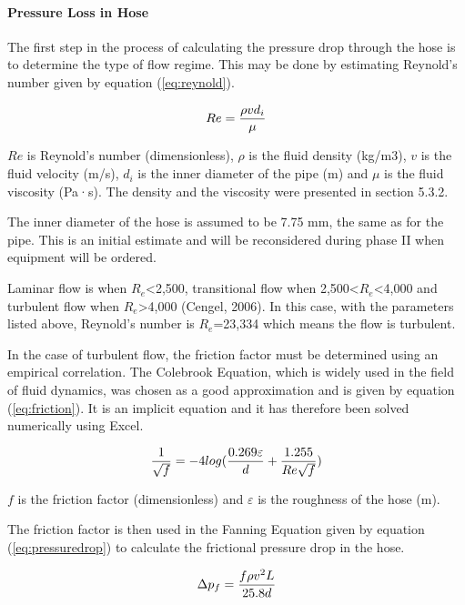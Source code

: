 \paragraph{Pressure Loss in Hose}
The first step in the process of calculating the pressure drop through the hose is to determine the type of flow regime. This may be done by estimating Reynold’s number given by equation (\ref{eq:reynold}).

\begin{equation}
\centering
   Re= \frac{\rho v d_i}{\mu}
\label{eq:reynold}
\end{equation}

$Re$ is Reynold’s number (dimensionless), $\rho$ is the fluid density (kg/m3), $v$ is the fluid velocity (m/s), $d_i$ is the inner diameter of the pipe (m) and $\mu$ is the fluid viscosity (Pa·s). The density and the viscosity were presented in section 5.3.2.

The inner diameter of the hose is assumed to be 7.75 mm, the same as for the pipe. This is an initial estimate and will be reconsidered during phase II when equipment will be ordered.

Laminar flow is when $R_e$<2,500, transitional flow when 2,500<$R_e$<4,000 and turbulent flow when $R_e$>4,000 (Cengel, 2006). In this case, with the parameters listed above, Reynold’s number is $R_e$=23,334 which means the flow is turbulent.

In the case of turbulent flow, the friction factor must be determined using an empirical correlation. The Colebrook Equation, which is widely used in the field of fluid dynamics, was chosen as a good approximation and is given by equation (\ref{eq:friction}). It is an implicit equation and it has therefore been solved numerically using Excel.

\begin{equation}
\centering
   \frac{1}{\sqrt{f}}=-4 log (\frac{0.269\varepsilon}{d}+\frac{1.255}{Re\sqrt{f}})
\label{eq:friction}
\end{equation}

$f$ is the friction factor (dimensionless) and $\varepsilon$ is the roughness of the hose (m).

The friction factor is then used in the Fanning Equation given by equation (\ref{eq:pressuredrop}) \cite{bourg} to calculate the frictional pressure drop in the hose.

\begin{equation}
\centering
   \Delta p_f = \frac{f\rho v^2 L}{25.8 d}
\label{eq:pressuredrop}
\end{equation}

